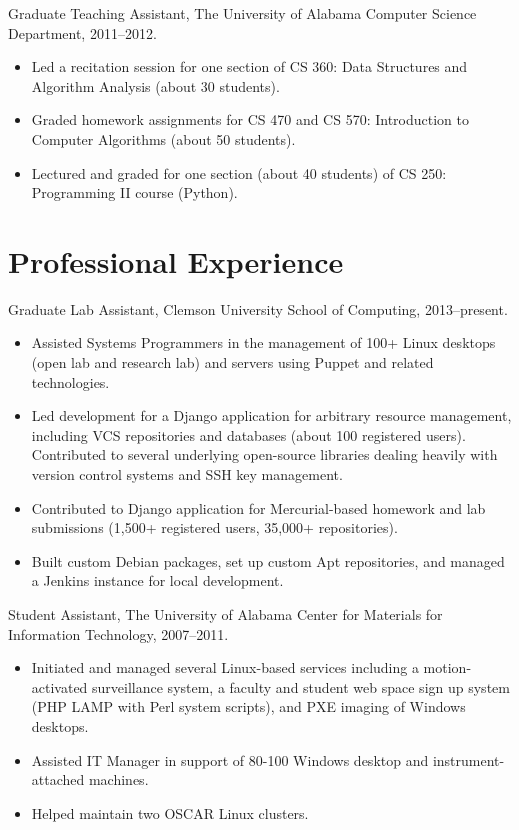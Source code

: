 \documentclass[12pt,oldfontcommands]{memoir}
\begin{document}
Graduate Teaching Assistant, The University of Alabama Computer Science
Department, 2011--2012.

\begin{itemize}
  \item Led a recitation session for one section of CS 360: Data Structures and
        Algorithm Analysis (about 30 students).
  \item Graded homework assignments for CS 470 and CS 570: Introduction to
        Computer Algorithms (about 50 students).
  \item Lectured and graded for one section (about 40 students) of CS 250:
        Programming II course (Python).
\end{itemize}

\section*{Professional Experience}

Graduate Lab Assistant, Clemson University School of Computing, 2013--present.

\begin{itemize}
  \item Assisted Systems Programmers in the management of 100+ Linux desktops
        (open lab and research lab) and servers using Puppet and related
        technologies.
  \item Led development for a Django application for arbitrary resource
        management, including VCS repositories and databases (about 100
        registered users). Contributed to several underlying open-source
        libraries dealing heavily with version control systems and SSH key
        management.
  \item Contributed to Django application for Mercurial-based homework and lab
        submissions (1,500+ registered users, 35,000+ repositories).
  \item Built custom Debian packages, set up custom Apt repositories, and
        managed a Jenkins instance for local development.
\end{itemize}


Student Assistant, The University of Alabama Center for Materials for
Information Technology, 2007--2011.

\begin{itemize}
  \item Initiated and managed several Linux-based services including a
        motion-activated surveillance system, a faculty and student web space
        sign up system (PHP LAMP with Perl system scripts), and PXE imaging of
        Windows desktops.
  \item Assisted IT Manager in support of 80-100 Windows desktop and
        instrument-attached machines.
  \item Helped maintain two OSCAR Linux clusters.
\end{itemize}
\end{document}
